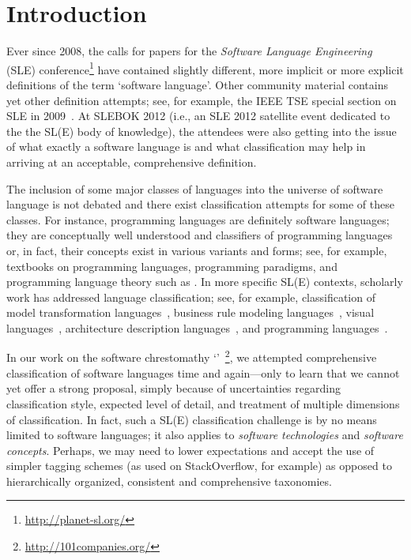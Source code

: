 
\section{Introduction}
\label{S:intro}

Ever since 2008, the calls for papers for the \emph{Software Language Engineering} (SLE) conference\footnote{\url{http://planet-sl.org/}} have contained slightly different, more implicit or more explicit definitions of the term `software language'. Other community material contains yet other definition attempts; see, for example, the IEEE TSE special section on SLE in 2009~\cite{FavreGLW09}. At SLEBOK 2012 (i.e., an SLE 2012 satellite event dedicated to the the SL(E) body of knowledge), the attendees were also getting into the issue of what exactly a software language is and what classification may help in arriving at an acceptable, comprehensive definition.

The inclusion of some major classes of languages into the universe of software language is not debated and there exist classification attempts for some of these classes. For instance, programming languages are definitely software languages; they are conceptually well understood and classifiers of programming languages or, in fact, their concepts exist in various variants and forms; see, for example, textbooks on programming languages, programming paradigms, and programming language theory such as \cite{Mosses92,Sebesta12,Pierce02,Sestoft12}. In more specific SL(E) contexts, scholarly work has addressed language classification; see, for example, classification of model transformation languages~\cite{CzarneckiH06}, business rule modeling languages~\cite{SkalnaG12}, visual languages~\cite{BottoniG04,MarriottM97,BurnettB94}, architecture description languages~\cite{MedvidovicT00}, and programming languages~\cite{BabenkoRY75,DoyleS87}.

In our work on the software chrestomathy `\oneohone'~\cite{FavreLV12}\footnote{\url{http://101companies.org/}}, we attempted comprehensive classification of software languages time and again---only to learn that we cannot yet offer a strong proposal, simply because of uncertainties regarding classification style, expected level of detail, and treatment of multiple dimensions of classification. In fact, such a SL(E) classification challenge is by no means limited to software languages; it also applies to \emph{software technologies} and \emph{software concepts}. Perhaps, we may need to lower expectations and accept the use of simpler tagging schemes (as used on StackOverflow, for example) as opposed to hierarchically organized, consistent and comprehensive taxonomies.

